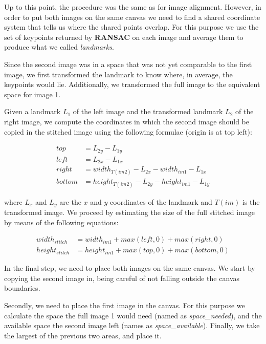 \documentclass[11pt]{article}
\begin{document}
Up to this point, the procedure was the same as for image alignment. However, in
order to put both images on the same canvas we need to find a shared coordinate
system that tells us where the shared points overlap. For this purpose we use
the set of keypoints returned by \textbf{RANSAC} on each image and average them
to produce what we called \textit{landmarks}.

Since the second image was in a space that was not yet comparable to the first
image, we first transformed the landmark to know where, in average, the
keypoints would lie. Additionally, we transformed the full image to the
equivalent space for image 1.

Given a landmark $L_1$ of the left image and the transformed landmark $L_2$ of
the right image, we compute the coordinates in which the second image should be
copied in the stitched image using the following formulae (origin is at top left):

\begin{equation}
	\begin{split}
		top &= L_{2y} - L_{1y} \\
		left &= L_{2x} - L_{1x} \\
		right &= width_{T(im2)} - L_{2x} - width_{im1} - L_{1x} \\
		bottom &= height_{T(im2)} - L_{2y} - height_{im1} - L_{1y}
	\end{split}
	\label{eq:stitch_corners}
\end{equation}

where $L_x$ and $L_y$ are the $x$ and $y$ coordinates of the landmark and
$T(im)$ is the transformed image. We proceed by estimating the size of the full
stitched image by means of the following equations:

\begin{equation}
	\begin{split}
		width_{stitch} &= width_{im1} + max(left, 0) + max(right, 0) \\
		height_{stitch} &= height_{im1} + max(top, 0) + max(bottom, 0)
	\end{split}
	\label{eq:estimate_stitch}
\end{equation}

In the final step, we need to place both images on the same canvas. We start by
copying the second image in, being careful of not falling outside the canvas
boundaries.

Secondly, we need to place the first image in the canvas. For this purpose we
calculate the space the full image 1 would need (named as
\textit{space\_needed}), and the available space the second image left (names as
\textit{space\_available}). Finally, we take the largest of the previous two
areas, and place it.
\end{document}
